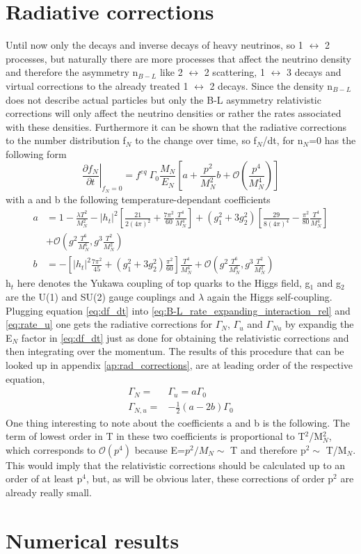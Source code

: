 \section{Radiative corrections}
Until now only the decays and inverse decays of heavy neutrinos, so 1 $\leftrightarrow$ 2 processes, but naturally there are more processes that affect the neutrino density and therefore the asymmetry n$_{B-L}$ like 2 $\leftrightarrow$ 2 scattering, 1 $\leftrightarrow$ 3 decays and virtual corrections to the already treated 1 $\leftrightarrow$ 2 decays. \newline
Since the density n$_{B-L}$ does not describe actual particles but only the B-L asymmetry relativistic corrections will only affect the neutrino densities or rather the rates associated with these densities. Furthermore it can be shown that the radiative corrections to the number distribution f$_N$ to the change over time, so f$_N$/dt, for n$_N$=0 has the following form \cite{Laine:2011pq}
\begin{equation}
\left.\frac{\partial f_N}{\partial t}\right|_{f_N=0}=f^{eq}\:\Gamma_0\frac{M_N}{E_N}\left[a+\frac{p^2}{M_N^2}b+\mathcal{O}\left(\frac{p^4}{M_N^4}\right)\right]
\label{eq:df_dt}
\end{equation}
with a and b the following temperature-dependant coefficients
\begin{align}
a&=1-\frac{\lambda T^2}{M_N^2}-\left|h_t\right|^2\left[\frac{21}{2(4\pi)^2}+\frac{7\pi^2}{60}\frac{T^4}{M_N^4}\right]+\left(g_1^2+3g_2^2\right)\left[\frac{29}{8\left(4\pi\right)^4}-\frac{\pi^2}{80}\frac{T^4}{M_N^4}\right]\\
\nonumber
&+\mathcal{O}\left(g^2\frac{T^6}{M_N^6},g^3\frac{T^2}{M_N^2}\right)\\
b&=-\left[\left|h_t\right|^2\frac{7\pi^2}{45}+\left(g_1^2+3g_2^2\right)\frac{\pi^2}{60}\right]\frac{T^4}{M_N^4}+\mathcal{O}\left(g^2\frac{T^6}{M_N^6},g^3\frac{T^2}{M_N^2}\right)
\end{align}
h$_t$ here denotes the Yukawa coupling of top quarks to the Higgs field, g$_1$ and g$_2$ are the U(1) and SU(2) gauge couplings and $\lambda$ again the Higgs self-coupling. \newline
Plugging equation \ref{eq:df_dt} into \ref{eq:B-L_rate_expanding_interaction_rel} and \ref{eq:rate_u} one gets the radiative corrections for $\Gamma_N$, $\Gamma_u$ and $\Gamma_{Nu}$ by expandig the E$_N$ factor in \ref{eq:df_dt} just as done for obtaining the relativistic corrections and then integrating over the momentum. The results of this procedure that can be looked up in appendix \ref{ap:rad_corrections}, are at leading order of the respective equation,
\begin{align}
	\Gamma_N=&\Gamma_u=a\Gamma_0\\
	\Gamma_{N,u}=&-\frac{1}{2}(a-2b)\Gamma_0
\end{align}
One thing interesting to note about the coefficients a and b is the following. The term of lowest order in T in these two coefficients is proportional to T$^2$/M$_N^2$, which corresponds to $\mathcal{O}(p^4)$ because E=$p^2/M_N\sim$ T and therefore p$^2\sim$ T/M$_N$. This would imply that the relativistic corrections should be calculated up to an order of at least p$^4$, but, as will be obvious later, these corrections of order p$^2$ are already really small.
\section{Numerical results}